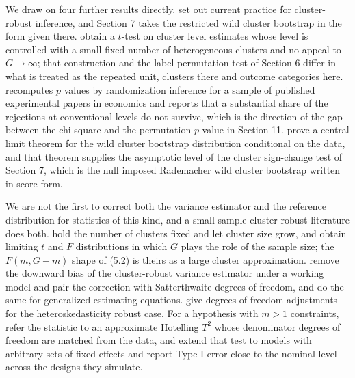 \documentclass[12pt]{article}
\theoremstyle{definition}
\numberwithin{equation}{section}
\begin{document}
We draw on four further results directly. \citet{mackinnon2023guide} set out current
practice for cluster-robust inference, and Section 7 takes the
restricted wild cluster bootstrap in the form given there.
\citet{ibragimov2010tstat} obtain a $t$-test on cluster level estimates whose
level is controlled with a small fixed number of heterogeneous clusters and no
appeal to $G \to \infty$; that construction and the label permutation test of
Section 6 differ in what is treated as the repeated unit, clusters
there and outcome categories here. \citet{young2019fisher} recomputes
$p$ values by randomization inference for a sample of published experimental
papers in economics and reports that a substantial share of the rejections at
conventional levels do not survive, which is the direction of the gap between
the chi-square and the permutation $p$ value in Section 11.
\citet{djogbenou2019asymptotic} prove a central limit theorem for the wild
cluster bootstrap distribution conditional on the data, and that theorem
supplies the asymptotic level of the cluster sign-change test of Section
7, which is the null imposed Rademacher wild cluster bootstrap
written in score form.

We are not the first to correct both the variance estimator and the reference
distribution for statistics of this kind, and a small-sample cluster-robust literature does both.
\citet{bester2011cluster} hold the number of clusters fixed and let cluster
size grow, and obtain limiting $t$ and $F$ distributions in which $G$ plays
the role of the sample size; the $F(m,G-m)$ shape of (5.2) is
theirs as a large cluster approximation.
\citet{bell2002bias} remove the downward bias of the cluster-robust variance
estimator under a working model and pair the correction with Satterthwaite
degrees of freedom, and \citet{panwall2002} do the same for generalized
estimating equations. \citet{imbens2016robust} give degrees of freedom
adjustments for the heteroskedasticity robust case. For a hypothesis with
$m > 1$ constraints, \citet{tipton2015small} refer the statistic to an
approximate Hotelling $T^2$ whose denominator degrees of freedom are matched
from the data, and \citet{pustejovsky2018small} extend that test to models with
arbitrary sets of fixed effects and report Type I error close to the nominal
level across the designs they simulate.
\end{document}
